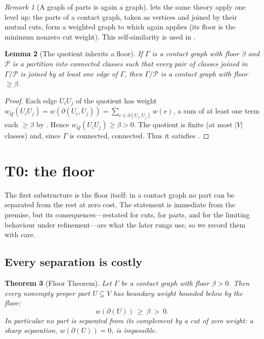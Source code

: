 \documentclass[11pt,a4paper]{article}
\theoremstyle{thmstyle}
\newtheorem{theorem}{Theorem}[section]
\newtheorem{lemma}[theorem]{Lemma}
\theoremstyle{definition}
\theoremstyle{remark}
\newtheorem{remark}[theorem]{Remark}
\newcommand{\Gph}{\Gamma}                 %
\newcommand{\V}{V}                        %
\newcommand{\wt}{w}                       %
\newcommand{\floorc}{\beta}               %
\newcommand{\cut}{\partial}               %
\newcommand{\Quot}{Q}                     %
\newcommand{\abs}[1]{\lvert#1\rvert}
\begin{document}
\begin{remark}[A graph of parts is again a graph]
\label{rem:quotient}
 lets the same theory apply one level up: the parts of a
contact graph, taken as vertices and joined by their mutual cuts, form a
weighted graph to which  again applies (its floor is the
minimum nonzero cut weight). This self-similarity is used in
.
\end{remark}

\begin{lemma}[The quotient inherits a floor]
\label{lem:quotient-floor}
If $\Gph$ is a contact graph with floor $\floorc$ and $\mathcal{P}$ is a
partition into connected classes such that every pair of classes joined in
$\Gph/\mathcal{P}$ is joined by at least one edge of $\Gph$, then
$\Gph/\mathcal{P}$ is a contact graph with floor $\ge\floorc$.
\end{lemma}

\begin{proof}
Each edge $U_iU_j$ of the quotient has weight
$\wt_{\Quot}(U_iU_j)=\wt(\cut(U_i,U_j))=\sum_{e\in\cut(U_i,U_j)}\wt(e)$, a sum of
at least one term each $\ge\floorc$ by . Hence
$\wt_{\Quot}(U_iU_j)\ge\floorc>0$. The quotient is finite (at most $\abs{\V}$
classes) and, since $\Gph$ is connected, connected. Thus it satisfies
.
\end{proof}


\section{T0: the floor}
\label{sec:floor}

The first substructure is the floor itself: in a contact graph no part can be
separated from the rest at zero cost. The statement is immediate from the
premise, but its consequences---restated for cuts, for parts, and for the
limiting behaviour under refinement---are what the later rungs use, so we record
them with care.

\subsection{Every separation is costly}

\begin{theorem}[Floor Theorem]
\label{thm:floor}
Let $\Gph$ be a contact graph with floor $\floorc>0$. Then every nonempty proper
part $U\subsetneq\V$ has boundary weight bounded below by the floor:
\[
\boxed{\ \wt(\cut(U))\ \ge\ \floorc\ >\ 0.\ }
\]
In particular no part is separated from its complement by a cut of zero
weight: a \emph{sharp} separation, $\wt(\cut(U))=0$, is impossible.
\end{theorem}
\end{document}
